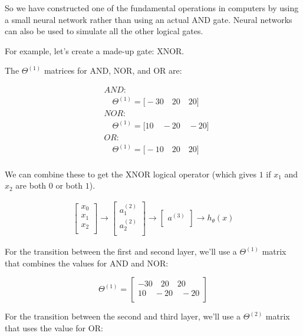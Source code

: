 So we have constructed one of the fundamental operations in computers by using a small neural network rather than using an actual AND gate. Neural networks can also be used to simulate all the other logical gates.

For example, let's create a made-up gate: XNOR.

The $\Theta^{(1)}$ matrices for AND, NOR, and OR are:

\begin{align*}
	& AND: \\
	& \quad \Theta^{(1)} = \Big[ -30 \quad 20 \quad 20\Big] \\
	& NOR: \\
	& \quad \Theta^{(1)} = \Big[ 10 \quad -20 \quad -20\Big] \\
	& OR: \\
	& \quad \Theta^{(1)} = \Big[ -10 \quad 20 \quad 20\Big] \\
\end{align*}

We can combine these to get the XNOR logical operator (which gives $1$ if $x_1$ and $x_2$ are both $0$ or both $1$).


\begin{align}
	\begin{bmatrix}
		x_0 \\
		x_1 \\
		x_2 \\
	\end{bmatrix}
	\rightarrow
	\begin{bmatrix}
		a_1^{(2)} \\
		a_2^{(2)} \\
	\end{bmatrix}
	\rightarrow
	\begin{bmatrix}
		a^{(3)} \\
	\end{bmatrix}
	\rightarrow
	h_{\theta}(x)
\end{align}

For the transition between the first and second layer, we'll use a $\Theta^{(1)}$ matrix that combines the values for AND and NOR:

$$\Theta^{(1)} = \begin{bmatrix}
	-30 \quad 20 \quad 20 \\
	10 \quad -20 \quad -20 \\
\end{bmatrix}$$

For the transition between the second and third layer, we'll use a $\Theta^{(2)}$ matrix that uses the value for OR:

